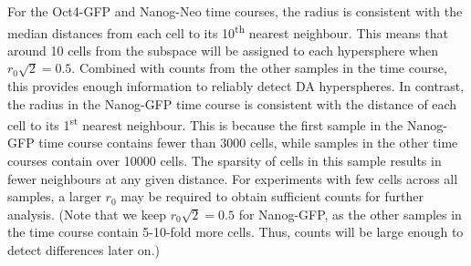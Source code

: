 \documentclass{article}
\begin{document}
%
  
For the Oct4-GFP and Nanog-Neo time courses, the radius is consistent with the median distances from each cell to its 10\textsuperscript{th} nearest neighbour.
This means that around 10 cells from the subspace will be assigned to each hypersphere when $r_0\sqrt{2}=0.5$.
Combined with counts from the other samples in the time course, this provides enough information to reliably detect DA hyperspheres.
In contrast, the radius in the Nanog-GFP time course is consistent with the distance of each cell to its 1\textsuperscript{st} nearest neighbour.
This is because the first sample in the Nanog-GFP time course contains fewer than 3000 cells, while samples in the other time courses contain over 10000 cells.
The sparsity of cells in this sample results in fewer neighbours at any given distance.
For experiments with few cells across all samples, a larger $r_0$ may be required to obtain sufficient counts for further analysis.
(Note that we keep $r_0\sqrt{2}=0.5$ for Nanog-GFP, as the other samples in the time course contain 5-10-fold more cells.
Thus, counts will be large enough to detect differences later on.)
\end{document}
